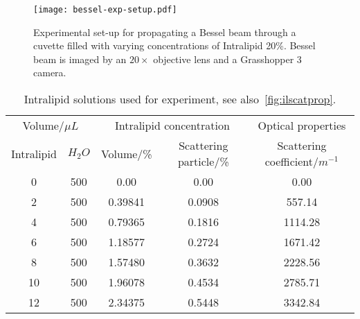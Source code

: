 \begin{figure}[ht!]
    \centering
    \texttt{[image: bessel-exp-setup.pdf]}
    \caption{Experimental set-up for propagating a Bessel beam through a cuvette filled with varying concentrations of Intralipid 20\%. Bessel beam is imaged by an $20\times$ objective lens and a Grasshopper 3 camera.}
    \label{fig:expsetup}
\end{figure}


\begin{table}[!ht]
    \begin{tabular}{cc|cc|c}
        \hline
        \multicolumn{2}{c|}{Volume/$\mu L$} & \multicolumn{2}{c|}{Intralipid concentration}                       & Optical properties              \\
        Intralipid                & $H_2O$  & Volume/\%      & Scattering particle/\%                             & Scattering coefficient/$m^{-1}$ \\ \hline
        \multicolumn{1}{c|}{0}    & 500     & \multicolumn{1}{c|}{0.00}    & 0.00                                 & 0.00                            \\
        \multicolumn{1}{c|}{2}    & 500     & \multicolumn{1}{c|}{0.39841} & 0.0908                               & 557.14                          \\
        \multicolumn{1}{c|}{4}    & 500     & \multicolumn{1}{c|}{0.79365} & 0.1816                               & 1114.28                         \\
        \multicolumn{1}{c|}{6}    & 500     & \multicolumn{1}{c|}{1.18577} & 0.2724                               & 1671.42                         \\
        \multicolumn{1}{c|}{8}    & 500     & \multicolumn{1}{c|}{1.57480} & 0.3632                               & 2228.56                         \\
        \multicolumn{1}{c|}{10}   & 500     & \multicolumn{1}{c|}{1.96078} & 0.4534                               & 2785.71                         \\
        \multicolumn{1}{c|}{12}   & 500     & \multicolumn{1}{c|}{2.34375} & 0.5448                               & 3342.84                         \\ \hline
    \end{tabular}
    \caption{Intralipid solutions used for experiment, see also~\cref{fig:ilscatprop}.}
    \label{tab:intra}
\end{table}

